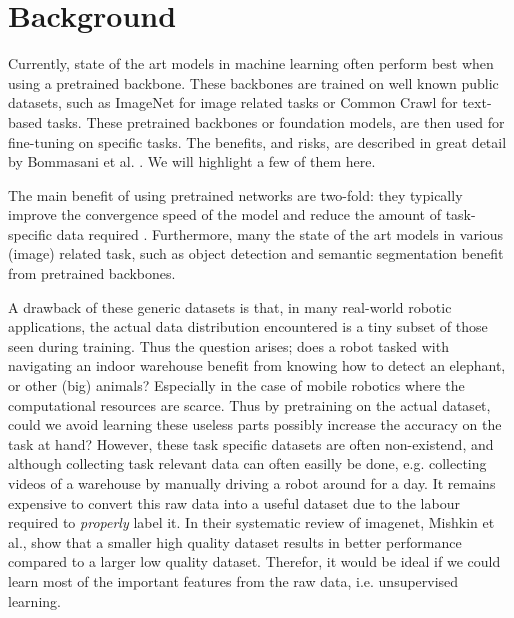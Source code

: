 \chapter{Background}
Currently, state of the art models in machine learning often perform best when using a pretrained backbone. These backbones are trained on well known public datasets, such as ImageNet \cite{deng2009imagenet} for image related tasks or Common Crawl \cite{commoncrawl} for text-based tasks. These pretrained backbones or foundation models, are then used for fine-tuning on specific tasks. The benefits, and risks, are described in great detail by Bommasani et al. \cite{DBLP:journals/corr/abs-2108-07258}. We will highlight a few of them here.

The main benefit of using pretrained networks are two-fold: they typically improve the convergence speed of the model and reduce the amount of task-specific data required \cite{donahue2014decaf,zeiler2014visualizing}. Furthermore, many the state of the art models in various (image) related task, such as object detection\cite{liu2016ssd,redmon2016you} and semantic segmentation \cite{orsic2019defense,girshick2014rich} benefit from pretrained backbones.

A drawback of these generic datasets is that, in many real-world robotic applications, the actual data distribution encountered is a tiny subset of those seen during training. Thus the question arises; does a robot tasked with navigating an indoor warehouse benefit from knowing how to detect an elephant, or other (big) animals? Especially in the case of mobile robotics where the computational resources are scarce. Thus by pretraining on the actual dataset, could we avoid learning these useless parts possibly increase the accuracy on the task at hand? However, these task specific datasets are often non-existend, and although collecting task relevant data can often easilly be done, e.g. collecting videos of a warehouse by manually driving a robot around for a day. It remains expensive to convert this raw data into a useful dataset due to the labour required to \emph{properly} label it. In their systematic review of imagenet, Mishkin et al.\cite{MISHKIN201711}, show that a smaller high quality dataset results in better performance compared to a larger low quality dataset. Therefor, it would be ideal if we could learn most of the important features from the raw data, i.e. unsupervised learning.

